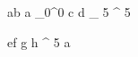 \begin{eqcode}{a}{b}{}{}
  a \gets {}_0^0 \lend
  c \gets d _ 5 ^ 5 \lend
\end{eqcode}


\begin{eqcode}{e}{f}{}{}
  g \gets h ^ 5 \lend
  a  \lend
\end{eqcode}
